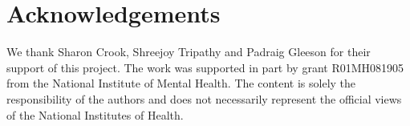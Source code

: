 \documentclass[9pt]{sig-alternate}
\begin{document}


\section*{Acknowledgements}
We thank Sharon Crook, Shreejoy Tripathy and Padraig Gleeson for their support of this project.  
The work was supported in part by grant R01MH081905 from the National Institute of Mental Health. 
The content is solely the responsibility of the authors and does not necessarily represent the official views of the National Institutes of Health.



\end{document}
